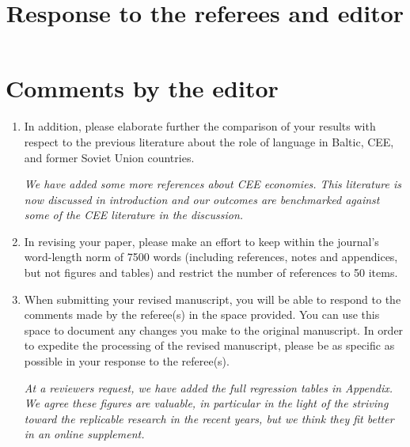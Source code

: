 \documentclass{article}
\date{}
\title{Response to the referees and editor}
\newcommand{\debug}[1]{\marginpar{\small\raggedright\begin{spacing}{1}
      \color{BrickRed} #1
\end{spacing}
}}
\newenvironment{response}
{\slshape}{}
\begin{document}
\section{Comments by the editor}


\begin{enumerate}
\item In addition, please elaborate further the comparison of your
  results with respect to the previous literature about the role of
  language in Baltic, CEE, and former Soviet Union countries.

  \begin{response}
    We have added some more references about CEE economies.  This
    literature is now discussed in introduction and our outcomes are
    benchmarked against some of the CEE literature in the discussion. 
  \end{response}
\item 
In revising your paper, please make an effort to keep within the
journal's word-length norm of 7500 words (including references, notes
and appendices, but not figures and tables) and restrict the number of
references to 50 items.

\item When submitting your revised manuscript, you will be able to respond to the comments made by the referee(s) in the space provided.  You can use this space to document any changes you make to the original manuscript.  In order to expedite the processing of the revised manuscript, please be as specific as possible in your response to the referee(s).

\begin{response}
  At a reviewers request, we have added the full regression tables in
  Appendix.  We agree these figures are valuable, in particular in the
  light of the striving toward the replicable research in the recent
  years, but we think they fit better in an online supplement.
\end{response}

\end{enumerate}
\end{document}
